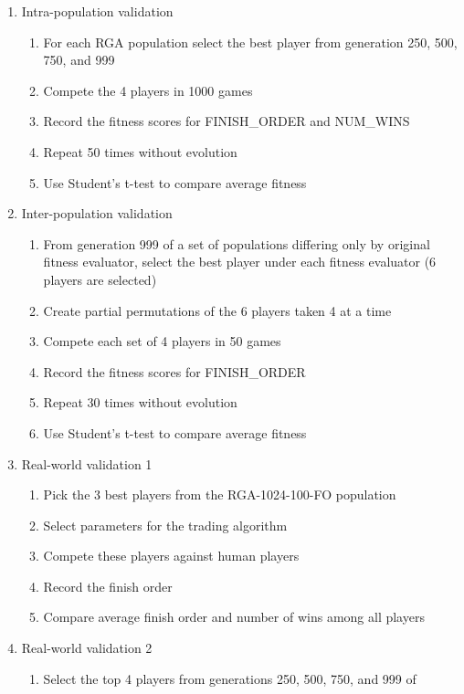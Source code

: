 \begin{enumerate}
  \item {Intra-population validation}
  \begin{enumerate}
    \item {For each RGA population select the best player from generation 250,
    500, 750, and 999}
    \item {Compete the 4 players in 1000 games}
    \item {Record the fitness scores for FINISH\_ORDER and NUM\_WINS}
    \item {Repeat 50 times without evolution}
    \item {Use Student's t-test to compare average fitness}
  \end{enumerate}
  \item {Inter-population validation}
  \begin{enumerate}
    \item {From generation 999 of a set of populations differing only by
    original fitness evaluator, select the best player under each fitness
    evaluator (6 players are selected)}
    \item {Create partial permutations of the 6 players taken 4 at a time}
    \item {Compete each set of 4 players in 50 games}
    \item {Record the fitness scores for FINISH\_ORDER}
    \item {Repeat 30 times without evolution}
    \item {Use Student's t-test to compare average fitness}
  \end {enumerate}
  \item {Real-world validation 1}
  \begin{enumerate}
    \item {Pick the 3 best players from the RGA-1024-100-FO population}
    \item {Select parameters for the trading algorithm}
    \item {Compete these players against human players}   
    \item {Record the finish order}
    \item {Compare average finish order and number of wins among all players}
  \end{enumerate}
  \item {Real-world validation 2}
  \begin{enumerate}
    \item {Select the top 4 players from generations 250, 500, 750, and 999 of 
}
\end{enumerate}
\end{enumerate}

